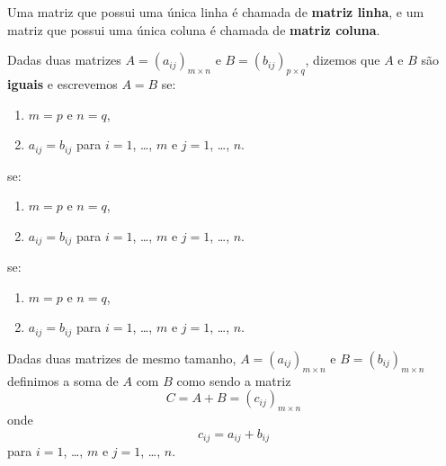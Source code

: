 \documentclass{beamer}
\begin{document}
    \begin{frame}
    \begin{definicao}
      Uma matriz que possui uma única linha é chamada de \textbf{matriz linha}, e um matriz que possui uma única coluna
      é chamada de \textbf{matriz coluna}.
    \end{definicao}

    \begin{definicao}
      Dadas duas matrizes $A = (a_{ij})_{m \times n}$ e $B = (b_{ij})_{p \times q}$, dizemos que $A$ e $B$ são \textbf{iguais}
      e escrevemos $A = B$ se:
            \begin{enumerate}[label={\arabic*})]
              \item $m = p$ e $n = q$,
              \item $a_{ij} = b_{ij}$ para $i = 1$, \dots, $m$ e $j = 1$, \dots, $n$.
            \end{enumerate}se:
                  \begin{enumerate}[label={\arabic*})]
                    \item $m = p$ e $n = q$,
                    \item $a_{ij} = b_{ij}$ para $i = 1$, \dots, $m$ e $j = 1$, \dots, $n$.
                  \end{enumerate}se:
      \begin{enumerate}[label={\arabic*})]
        \item $m = p$ e $n = q$,
        \item $a_{ij} = b_{ij}$ para $i = 1$, \dots, $m$ e $j = 1$, \dots, $n$.
      \end{enumerate}
    \end{definicao}
  \end{frame}
  
  \begin{frame}
    \begin{definicao}
      Dadas duas matrizes de mesmo tamanho, $A = (a_{ij})_{m \times n}$ e $B = (b_{ij})_{m \times n}$ definimos a soma de $A$ com $B$ 
      como sendo a matriz
      \[
        C = A + B = (c_{ij})_{m \times n}
      \]
      onde
      \[
        c_{ij} = a_{ij} + b_{ij}
      \]
      para $i = 1$, \dots, $m$ e $j = 1$, \dots, $n$.
    \end{definicao}
  \end{frame}
\end{document}

